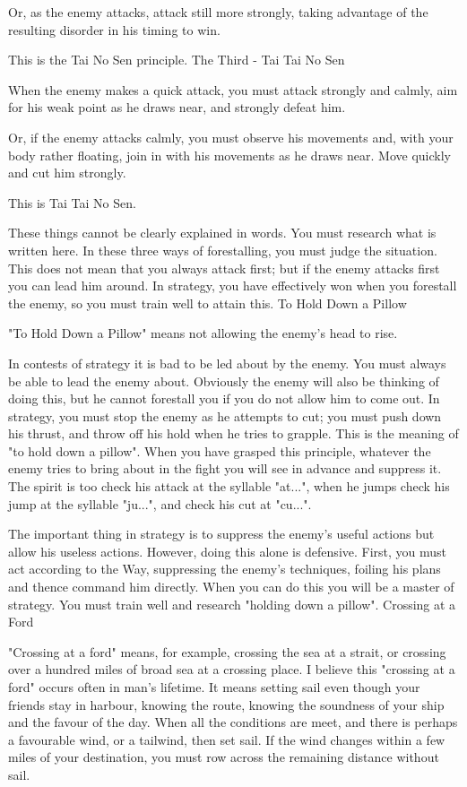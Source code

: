 Or, as the enemy attacks, attack still more strongly, taking advantage of the resulting disorder in his timing to win.

This is the Tai No Sen principle.
The Third - Tai Tai No Sen

When the enemy makes a quick attack, you must attack strongly and calmly, aim for his weak point as he draws near, and strongly defeat him.

Or, if the enemy attacks calmly, you must observe his movements and, with your body rather floating, join in with his movements as he draws near. Move quickly and cut him strongly.

This is Tai Tai No Sen.

These things cannot be clearly explained in words. You must research what is written here. In these three ways of forestalling, you must judge the situation. This does not mean that you always attack first; but if the enemy attacks first you can lead him around. In strategy, you have effectively won when you forestall the enemy, so you must train well to attain this.
To Hold Down a Pillow

"To Hold Down a Pillow" means not allowing the enemy's head to rise.

In contests of strategy it is bad to be led about by the enemy. You must always be able to lead the enemy about. Obviously the enemy will also be thinking of doing this, but he cannot forestall you if you do not allow him to come out. In strategy, you must stop the enemy as he attempts to cut; you must push down his thrust, and throw off his hold when he tries to grapple. This is the meaning of "to hold down a pillow". When you have grasped this principle, whatever the enemy tries to bring about in the fight you will see in advance and suppress it. The spirit is too check his attack at the syllable "at...", when he jumps check his jump at the syllable "ju...", and check his cut at "cu...".

The important thing in strategy is to suppress the enemy's useful actions but allow his useless actions. However, doing this alone is defensive. First, you must act according to the Way, suppressing the enemy's techniques, foiling his plans and thence command him directly. When you can do this you will be a master of strategy. You must train well and research "holding down a pillow".
Crossing at a Ford

"Crossing at a ford" means, for example, crossing the sea at a strait, or crossing over a hundred miles of broad sea at a crossing place. I believe this "crossing at a ford" occurs often in man's lifetime. It means setting sail even though your friends stay in harbour, knowing the route, knowing the soundness of your ship and the favour of the day. When all the conditions are meet, and there is perhaps a favourable wind, or a tailwind, then set sail. If the wind changes within a few miles of your destination, you must row across the remaining distance without sail.

